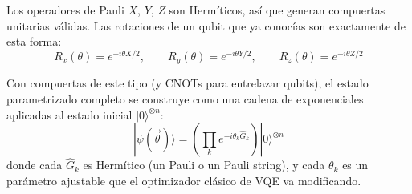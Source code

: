\documentclass[12pt]{article}
\begin{document}
\begin{ejemplo}[title=\textbf{Ejemplo: rotaciones de un qubit}]
Los operadores de Pauli $X$, $Y$, $Z$ son Hermíticos, así que generan
compuertas unitarias válidas. Las rotaciones de un qubit que ya conocías
son exactamente de esta forma:
\[
R_x(\theta) = e^{-i\theta X/2}, \qquad
R_y(\theta) = e^{-i\theta Y/2}, \qquad
R_z(\theta) = e^{-i\theta Z/2}
\]
\end{ejemplo}

Con compuertas de este tipo (y CNOTs para entrelazar qubits), el estado
parametrizado completo se construye como una cadena de exponenciales
aplicadas al estado inicial $|0\rangle^{\otimes n}$:
\[
|\psi(\vec\theta)\rangle = \left(\prod_k e^{-i\theta_k \hat{G}_k}\right)
|0\rangle^{\otimes n}
\]
donde cada $\hat{G}_k$ es Hermítico (un Pauli o un Pauli string), y cada
$\theta_k$ es un parámetro ajustable que el optimizador clásico de VQE va
modificando.
\end{document}
